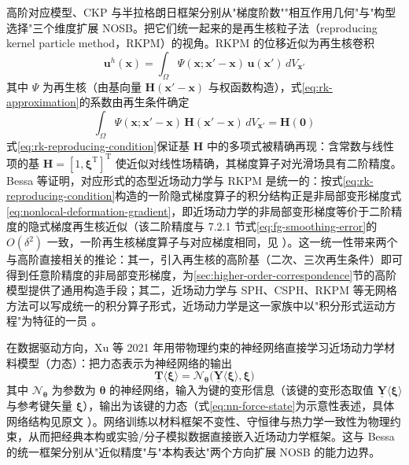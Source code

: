 高阶对应模型、CKP 与半拉格朗日框架分别从"梯度阶数""相互作用几何"与"构型选择"三个维度扩展 NOSB。把它们统一起来的是再生核粒子法（reproducing kernel particle method，RKPM）的视角。RKPM 的位移近似为再生核卷积
\begin{equation}
  \mathbf{u}^{h}(\mathbf{x})=\int_{\Omega}\Psi(\mathbf{x};\mathbf{x}'-\mathbf{x})\,\mathbf{u}(\mathbf{x}')\,dV_{\mathbf{x}'}
  \label{eq:rk-approximation}
\end{equation}
其中 $\Psi$ 为再生核（由基向量 $\mathbf{H}(\mathbf{x}'-\mathbf{x})$ 与权函数构造），式\eqref{eq:rk-approximation}的系数由再生条件确定
\begin{equation}
  \int_{\Omega}\Psi(\mathbf{x};\mathbf{x}'-\mathbf{x})\,\mathbf{H}(\mathbf{x}'-\mathbf{x})\,dV_{\mathbf{x}'}
  =\mathbf{H}(\mathbf{0})
  \label{eq:rk-reproducing-condition}
\end{equation}
式\eqref{eq:rk-reproducing-condition}保证基 $\mathbf{H}$ 中的多项式被精确再现：含常数与线性项的基 $\mathbf{H}=[1,\boldsymbol{\xi}^{\mathrm{T}}]^{\mathrm{T}}$ 使近似对线性场精确，其梯度算子对光滑场具有二阶精度。Bessa 等证明，对应形式的态型近场动力学与 RKPM 是统一的：按式\eqref{eq:rk-reproducing-condition}构造的一阶隐式梯度算子的积分结构正是非局部变形梯度式\eqref{eq:nonlocal-deformation-gradient}，即近场动力学的非局部变形梯度等价于二阶精度的隐式梯度再生核近似（该二阶精度与 7.2.1 节式\eqref{eq:fg-smoothing-error}的 $O(\delta^{2})$ 一致，一阶再生核梯度算子与对应梯度相同，见 \cite{Bessa2014}）。这一统一性带来两个与高阶直接相关的推论：其一，引入再生核的高阶基（二次、三次再生条件）即可得到任意阶精度的非局部变形梯度，为\ref{sec:higher-order-correspondence}节的高阶模型提供了通用构造手段；其二，近场动力学与 SPH、CSPH、RKPM 等无网格方法可以写成统一的积分算子形式，近场动力学是这一家族中以"积分形式运动方程"为特征的一员 \cite{Bessa2014}。

在数据驱动方向，Xu 等 2021 年用带物理约束的神经网络直接学习近场动力学材料模型（力态）\cite{Xu2021}：把力态表示为神经网络的输出
\begin{equation}
  \underline{\mathbf{T}}\langle\boldsymbol{\xi}\rangle=\mathcal{N}_{\boldsymbol{\theta}}\bigl(\underline{\mathbf{Y}}\langle\boldsymbol{\xi}\rangle,\boldsymbol{\xi}\bigr)
  \label{eq:nn-force-state}
\end{equation}
其中 $\mathcal{N}_{\boldsymbol{\theta}}$ 为参数为 $\boldsymbol{\theta}$ 的神经网络，输入为键的变形信息（该键的变形态取值 $\underline{\mathbf{Y}}\langle\boldsymbol{\xi}\rangle$ 与参考键矢量 $\boldsymbol{\xi}$），输出为该键的力态（式\eqref{eq:nn-force-state}为示意性表述，具体网络结构见原文 \cite{Xu2021}）。网络训练以材料框架不变性、守恒律与热力学一致性为物理约束，从而把经典本构或实验/分子模拟数据直接嵌入近场动力学框架。这与 Bessa 的统一框架分别从"近似精度"与"本构表达"两个方向扩展 NOSB 的能力边界。

